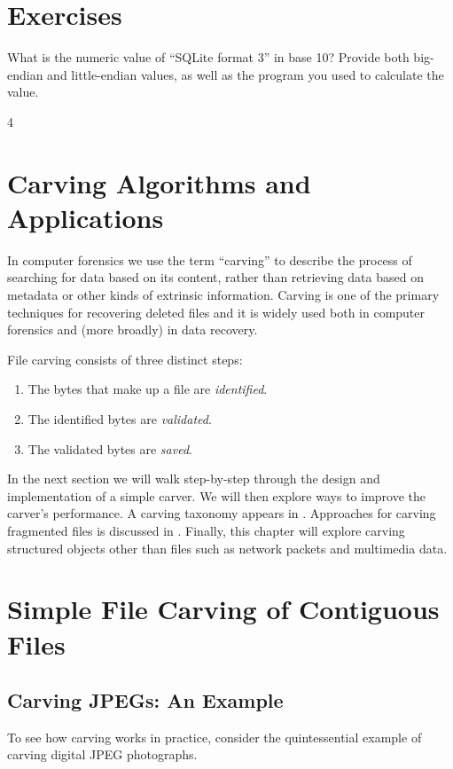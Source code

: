 \documentclass[11pt,letter]{article}
\begin{document}
\section{Exercises}

What is the numeric value of ``SQLite format 3'' in base 10? Provide
both big-endian and little-endian values, as well as the  program you
used to calculate the value. 

  4               %
\section{Carving Algorithms and Applications}
In computer forensics we use the term  ``carving'' to describe the
process of searching for data based on its content, rather than
retrieving data based on metadata or other kinds of extrinsic
information. Carving is one of the primary techniques for recovering deleted
files and it is widely used both in computer forensics and (more
broadly) in data recovery.

File carving consists of three distinct steps:
\begin{enumerate}
\renewcommand{\theenumi}{Step (\arabic{enumi})}
\item The bytes that make up a file are \emph{identified}.
\item The identified bytes are \emph{validated}.\label{step-validate}
\item The validated bytes are \emph{saved}.\label{step-save}
\end{enumerate}

In the next section we will walk step-by-step through the design and
implementation of a simple carver. We will then explore ways to
improve the carver's performance. A carving taxonomy appears in
. Approaches for carving fragmented files is
discussed in . Finally, this chapter will
explore carving structured objects other than files such as network
packets and multimedia data.

\section{Simple File Carving of Contiguous Files}
\subsection{Carving JPEGs: An Example}

To see how carving works in practice, consider the quintessential 
example of carving digital JPEG photographs.
\end{document}
